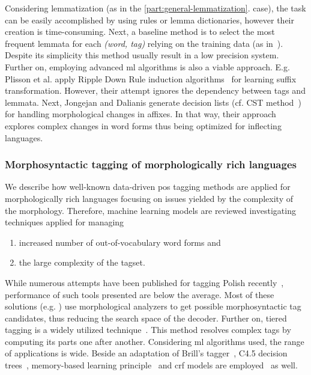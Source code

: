 Considering lemmatization (as in the \ref{part:general-lemmatization}. case), the task can be easily accomplished by using rules or lemma dictionaries, however their creation is time-consuming.
Next, a baseline method is to select the most frequent lemmata for each \emph{(word, tag)} relying on the training data (as in~\cite{zsibrata2013magyarlanc}). 
Despite its simplicity this method usually result in a low precision system.
Further on, employing advanced \gls{ml} algorithms is also a viable approach.
E.g. Plisson et al. apply Ripple Down Rule induction algorithms~\cite{Plisson2004} for learning suffix transformation.
However, their attempt ignores the dependency between tags and lemmata.
Next, Jongejan and Dalianis generate decision lists (cf. CST method~\cite{Jongejan}) for handling morphological changes in affixes.
In that way, their approach explores complex changes in word forms thus being optimized for inflecting languages.  

\subsubsection{Morphosyntactic tagging of morphologically rich languages}

We describe how well-known data-driven \gls{pos} tagging methods are applied for morphologically rich languages focusing on issues yielded by the complexity of the morphology.
Therefore, machine learning models are reviewed investigating techniques applied for managing
\begin{enumerate}
  \item increased number of out-of-vocabulary word forms and
  \item the large complexity of the tagset. 
\end{enumerate}

While numerous attempts have been published for tagging Polish recently~\cite{Piasecki2006,Piasecki2007,Acedanski2010,Radziszewski2013},  performance of such tools presented are below the average.
Most of these solutions (e.g. \cite{Radziszewski2013}) use morphological analyzers to get possible morphosyntactic tag candidates, thus reducing the search space of the decoder.
Further on, tiered tagging is a widely utilized technique~\cite{Radziszewski2013}.
This method resolves complex tags by computing its parts one after another.
Considering \acrshort{ml} algorithms used, the range of applications is wide.
Beside an adaptation of Brill’s tagger~\cite{Acedanski2010}, C4.5 decision trees~\cite{Piasecki2007}, memory-based learning principle~\cite{Radziszewski2011} and \acrshort{crf} models are employed~\cite{Radziszewski2013} as well. 

